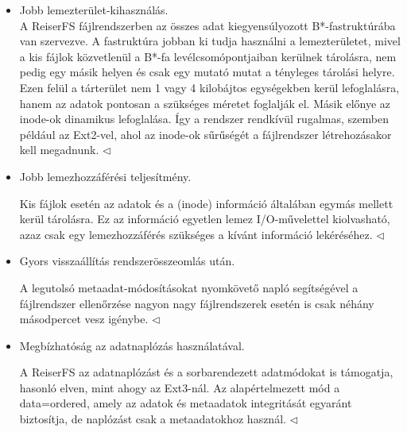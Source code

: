 \documentclass[tikz,12pt,margin=0px]{article}
\begin{document}
    \begin{itemize}[topsep=8pt,itemsep=4pt,partopsep=4pt, parsep=4pt]
        \item Jobb lemezterület-kihasználás.\\

        {\footnotesize \noindent {\color{blue} \faLightbulbO\ $\triangleright$ } }
        {\footnotesize
        \noindent A ReiserFS fájlrendszerben az összes adat kiegyensúlyozott B*-fastruktúrába van szervezve. A fastruktúra jobban ki tudja használni a lemezterületet, mivel a kis fájlok közvetlenül a B*-fa levélcsomópontjaiban kerülnek tárolásra, nem pedig egy másik helyen és csak egy mutató mutat a tényleges tárolási helyre. Ezen felül a tárterület nem 1 vagy 4 kilobájtos egységekben kerül lefoglalásra, hanem az adatok pontosan a szükséges méretet foglalják el. Másik előnye az inode-ok dinamikus lefoglalása. Így a rendszer rendkívül rugalmas, szemben például az Ext2-vel, ahol az inode-ok sűrűségét a fájlrendszer létrehozásakor kell megadnunk.
        $\triangleleft$ \faLightbulbO}\\

        \item Jobb lemezhozzáférési teljesítmény.

        {\footnotesize \noindent {\color{blue} \faLightbulbO\ $\triangleright$ } }
        {\footnotesize
        \noindent Kis fájlok esetén az adatok és a (inode) információ általában egymás mellett kerül tárolásra. Ez az információ egyetlen lemez I/O-művelettel kiolvasható, azaz csak egy lemezhozzáférés szükséges a kívánt információ lekéréséhez.
        $\triangleleft$ \faLightbulbO}

        \item Gyors visszaállítás rendszerösszeomlás után.

        {\footnotesize \noindent {\color{blue} \faLightbulbO\ $\triangleright$ } }
        {\footnotesize
        \noindent A legutolsó metaadat-módosításokat nyomkövető napló segítségével a fájlrendszer ellenőrzése nagyon nagy fájlrendszerek esetén is csak néhány másodpercet vesz igénybe.
        $\triangleleft$ \faLightbulbO}

        \item Megbízhatóság az adatnaplózás használatával.

        {\footnotesize \noindent {\color{blue} \faLightbulbO\ $\triangleright$ } }
        {\footnotesize
        \noindent A ReiserFS az adatnaplózást és a sorbarendezett adatmódokat is támogatja, hasonló elven, mint ahogy az Ext3-nál. Az alapértelmezett mód a data=ordered, amely az adatok és metaadatok integritását egyaránt biztosítja, de naplózást csak a metaadatokhoz használ.
        $\triangleleft$ \faLightbulbO}\\
    \end{itemize}
	
\end{document}
